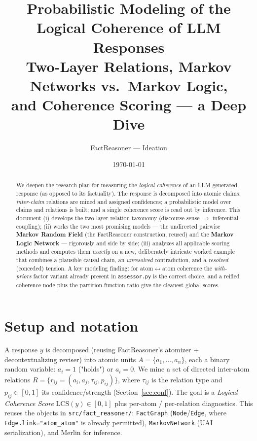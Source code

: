 \documentclass[11pt]{article}
\title{Probabilistic Modeling of the Logical Coherence of LLM Responses\\
       \large Two-Layer Relations, Markov Networks vs.\ Markov Logic,\\
       and Coherence Scoring --- a Deep Dive}
\author{FactReasoner --- Ideation}
\date{\today}
\begin{document}
\maketitle

\begin{abstract}
\noindent
We deepen the research plan for measuring the \emph{logical coherence} of an
LLM-generated response (as opposed to its factuality). The response is decomposed into
atomic claims; \emph{inter-claim} relations are mined and assigned confidences; a
probabilistic model over claims and relations is built; and a single coherence score is
read out by inference. This document (i) develops the two-layer relation taxonomy
(discourse sense $\to$ inferential coupling); (ii) works the two most promising models ---
the undirected pairwise \textbf{Markov Random Field} (the FactReasoner construction, reused)
and the \textbf{Markov Logic Network} --- rigorously and side by side; (iii) analyzes all
applicable scoring methods and computes them \emph{exactly} on a new, deliberately
intricate worked example that combines a plausible causal chain, an \emph{unresolved}
contradiction, and a \emph{resolved} (conceded) tension. A key modeling finding: for
atom$\leftrightarrow$atom coherence the \emph{with-priors} factor variant already present in
\texttt{assessor.py} is the correct choice, and a reified coherence node plus the
partition-function ratio give the cleanest global scores.
\end{abstract}

\tableofcontents

\section{Setup and notation}
\label{sec:setup}

A response $y$ is decomposed (reusing FactReasoner's atomizer + decontextualizing reviser)
into atomic units $A=\{a_1,\dots,a_n\}$, each a binary random variable: $a_i=1$ ("holds")
or $a_i=0$. We mine a set of directed inter-atom relations
$R=\{r_{ij}=(a_i,a_j,\tau_{ij},p_{ij})\}$, where $\tau_{ij}$ is the relation type and
$p_{ij}\in[0,1]$ its confidence/strength (Section~\ref{sec:conf}). The goal is a
\emph{Logical Coherence Score} $\mathrm{LCS}(y)\in[0,1]$ plus per-atom / per-relation
diagnostics. This reuses the objects in \texttt{src/fact\_reasoner/}: \texttt{FactGraph}
(\texttt{Node}/\texttt{Edge}, where \texttt{Edge.link="atom\_atom"} is already permitted),
\texttt{MarkovNetwork} (UAI serialization), and Merlin for inference.
\end{document}
